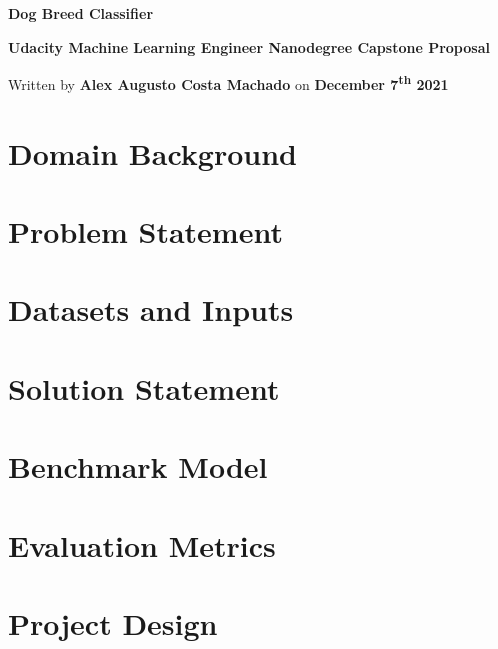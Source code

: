 \documentclass{article}
\newcommand{\doctitle}{Dog Breed Classifier}
\newcommand{\docsubtitle}{Udacity Machine Learning Engineer Nanodegree Capstone Proposal}
\newcommand{\docauthor}{Alex Augusto Costa Machado}
\newcommand{\docdate}{December 7\textsuperscript{th} 2021}
\newcommand{\docinfo}{
    \thispagestyle{empty}

    \begin{center}

        \Huge\textbf{\doctitle}
        \vspace{2mm}

        \LARGE\textbf{\docsubtitle}
        
        \vspace{3mm}
        \large
        Written by \textbf{\docauthor} on \textbf{\docdate}

    \end{center}
}
\begin{document}
    \docinfo

    \section{Domain Background}
    \section{Problem Statement}
    \section{Datasets and Inputs}
    \section{Solution Statement}
    \section{Benchmark Model}
    \section{Evaluation Metrics}
    \section{Project Design}
\end{document}
